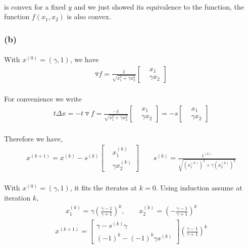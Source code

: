 \paragraph{}
is convex for a fixed $y$ and we just showed its equivalence to the function, the function $f(x_1,x_2)$ is also convex.
\subsubsection*{(b)}
\paragraph{}
With $x^{(0)} =(\gamma, 1)$, we have
\begin{align*}
\triangledown f = \frac{1}{\sqrt{x_1^2 + \gamma x_2^2}}\begin{bmatrix}
&x_1 \\ &\gamma x_2
\end{bmatrix}
\end{align*}
\paragraph{}
For convenience we write
\begin{align*}
t\Delta x = -t\triangledown f =  \frac{-t}{\sqrt{x_1^2 + \gamma x_2^2}}\begin{bmatrix}
&x_1 \\ &\gamma x_2 
\end{bmatrix} = -s \begin{bmatrix}
&x_1 \\ &\gamma x_2 
\end{bmatrix}
\end{align*}
\paragraph{}
Therefore we have,
\begin{align*}
x^{(k+1)} =x^{(k)} - s^{(k)}\begin{bmatrix}
&x_1^{(k)} \\ &\gamma x_2^{(k)}
\end{bmatrix} \qquad s^{(k)} = \frac{t^{(k)}}{\sqrt{(x_1^{(k)})^2 + \gamma (x_2^{(k)})^2}}
\end{align*}
\paragraph{}
With $x^{(0)} = (\gamma, 1)$, it fits the iterates at $k=0$. Using induction assume at iteration $k$, 
\begin{align*}
x_1^{(k)} = \gamma (\frac{\gamma -1}{\gamma +1})^k, \qquad x_2^{(k)} =(-\frac{\gamma -1}{\gamma +1})^k
\end{align*}
\begin{align*}
x^{(k+1)} = \begin{bmatrix}
\gamma - s^{(k)}\gamma \\ (-1)^k -(-1)^k\gamma s^{(k)}
\end{bmatrix}(\frac{\gamma -1}{\gamma +1})^k
\end{align*}
